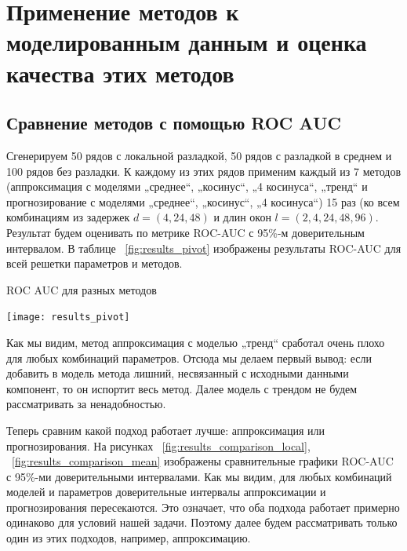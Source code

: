 \documentclass[%
12pt,
master,  %
natbib,      %
subf,        %
substylefile = spbu.rtx,
href,        %
colorlinks,  %
]{disser}
\begin{document}


\section{Применение методов к моделированным данным и оценка качества этих методов}

\subsection{Сравнение методов с помощью ROC AUC}

Сгенерируем 50 рядов с локальной разладкой, 50 рядов с разладкой в среднем и 100 рядов без разладки. К каждому из этих рядов применим каждый из 7 методов (аппроксимация с моделями „среднее“, „косинус“, „4 косинуса“, „тренд“ и прогнозирование с моделями  „среднее“, „косинус“, „4 косинуса“) 15 раз (ко всем комбинациям из задержек $d = (4,24,48)$ и длин окон $l = (2,4,24,48,96)$. Результат будем оценивать по метрике ROC-AUC с 95\%-м доверительным интервалом. В таблице ~\ref{fig:results_pivot} изображены результаты ROC-AUC для всей решетки параметров и методов.

\begin{table}[!hhh]
	\caption{ROC AUC для разных методов}
	\begin{center}
		\vspace{-5mm}\texttt{[image: results\_pivot]}
	\end{center}
	\label{fig:results_pivot}
\end{table}

Как мы видим, метод аппроксимация с моделью „тренд“ сработал очень плохо для любых комбинаций параметров. Отсюда мы делаем первый вывод: если добавить в модель метода лишний, несвязанный с исходными данными компонент, то он испортит весь метод. Далее модель с трендом не будем рассматривать за ненадобностью.

Теперь сравним какой подход работает лучше: аппроксимация или прогнозирования. На рисунках ~\ref{fig:results_comparison_local}, ~\ref{fig:results_comparison_mean} изображены сравнительные графики ROC-AUC с 95\%-ми доверительными интервалами. Как мы видим, для любых комбинаций моделей и параметров доверительные интервалы аппроксимации и прогнозирования пересекаются. Это означает, что оба подхода работает примерно одинаково для условий нашей задачи. Поэтому далее будем рассматривать только один из этих подходов, например, аппроксимацию.
\end{document}
